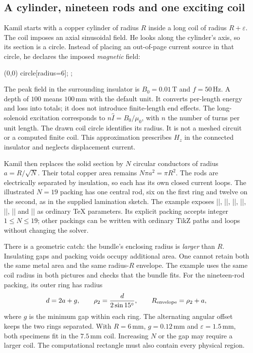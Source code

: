 \subsection{A cylinder, nineteen rods and one exciting coil}
Kamil starts with a copper cylinder of radius $R$ inside a long coil of radius
$R+\varepsilon$. The coil imposes an axial sinusoidal field. He looks along the
cylinder's axis, so its section is a circle. Instead of placing an out-of-page
current source in that circle, he declares the imposed \emph{magnetic} field:
\begin{codeexample}
\filldraw[fill=gray!25,
  femm/region={material=copper,mesh size=.24,curve tolerance=.002}]
  (0,0) circle[radius=6];
;
\end{codeexample}
The peak field in the surrounding insulator is $B_0=0.01\,\mathrm T$ and
$f=50\,\mathrm{Hz}$. A depth of $100$ means $100\,\mathrm{mm}$ with the default
unit. It converts per-length energy and loss into totals; it does not introduce
finite-length end effects. The long-solenoid excitation corresponds to
$n\widehat I=B_0/\mu_0$, with $n$ the number of turns per unit length.
The drawn coil circle identifies its radius. It is not a meshed circuit or a
computed finite coil. This approximation prescribes $H_z$ in the connected
insulator and neglects displacement current.

Kamil then replaces the solid section by $N$ circular conductors of radius
$a=R/\sqrt N$. Their total copper area remains
$N\pi a^2=\pi R^2$. The rods are electrically separated by insulation, so each
has its own closed current loops. The illustrated $N=19$ packing has one
central rod, six on the first ring and twelve on the second, as in the supplied
lamination sketch. The example exposes |\Radius|, |\Strands|, |\Gap|,
|\Epsilon|, |\Frequency|, |\AppliedB| and |\Length| as ordinary TeX parameters.
Its explicit packing accepts integer $1\leq N\leq19$; other packings can be
written with ordinary TikZ paths and loops without changing the solver.

There is a geometric catch: the bundle's enclosing radius is \emph{larger}
than $R$. Insulating gaps and packing voids occupy additional area. One cannot
retain both the same metal area and the same radius-$R$ envelope. The example
uses the same coil radius in both pictures and checks that the bundle fits.
For the nineteen-rod packing, its outer ring has radius
\[
 d=2a+g,\qquad \rho_2=\frac{d}{2\sin15^\circ},\qquad
 R_{\rm envelope}=\rho_2+a,
\]
where $g$ is the minimum gap within each ring. The alternating angular offset
keeps the two rings separated. With $R=6\,\mathrm{mm}$, $g=0.12\,\mathrm{mm}$
and $\varepsilon=1.5\,\mathrm{mm}$, both specimens fit in the
$7.5\,\mathrm{mm}$ coil. Increasing $N$ or the gap may require a larger coil.
The computational rectangle must also contain every physical region.

